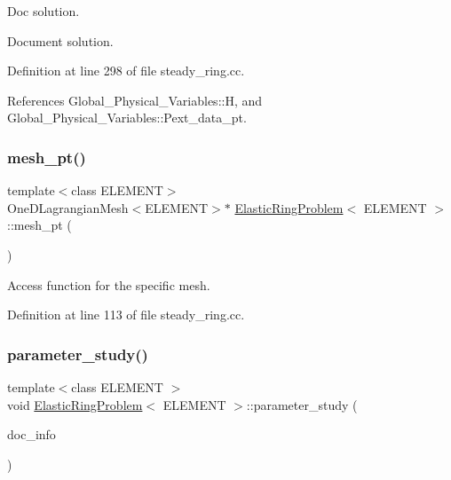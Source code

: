 Doc solution. 

Document solution. 

Definition at line 298 of file steady\+\_\+ring.\+cc.



References Global\+\_\+\+Physical\+\_\+\+Variables\+::H, and Global\+\_\+\+Physical\+\_\+\+Variables\+::\+Pext\+\_\+data\+\_\+pt.

\mbox{\label{classElasticRingProblem_a7e956ca937741ce71cf400eb492825b3}} 
\subsubsection{\texorpdfstring{mesh\+\_\+pt()}{mesh\_pt()}}
{\footnotesize\ttfamily template$<$class E\+L\+E\+M\+E\+NT$>$ \\
One\+D\+Lagrangian\+Mesh$<$E\+L\+E\+M\+E\+NT$>$$\ast$ \hyperlink{classElasticRingProblem}{Elastic\+Ring\+Problem}$<$ E\+L\+E\+M\+E\+NT $>$\+::mesh\+\_\+pt (\begin{DoxyParamCaption}{ }\end{DoxyParamCaption})\hspace{0.3cm}{\ttfamily [inline]}}



Access function for the specific mesh. 



Definition at line 113 of file steady\+\_\+ring.\+cc.

\mbox{\label{classElasticRingProblem_afed9c0948c535c315c3e22e92e3266d3}} 
\subsubsection{\texorpdfstring{parameter\+\_\+study()}{parameter\_study()}}
{\footnotesize\ttfamily template$<$class E\+L\+E\+M\+E\+NT $>$ \\
void \hyperlink{classElasticRingProblem}{Elastic\+Ring\+Problem}$<$ E\+L\+E\+M\+E\+NT $>$\+::parameter\+\_\+study (\begin{DoxyParamCaption}\item[{Doc\+Info \&}]{doc\+\_\+info }\end{DoxyParamCaption})}



